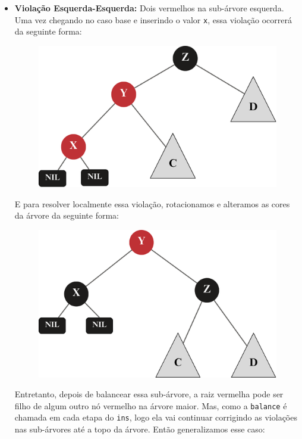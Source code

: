 \begin{itemize}
	\item \textbf{Violação Esquerda-Esquerda:} Dois vermelhos na sub-árvore esquerda. \\
	      Uma vez chegando no caso base e inserindo o valor \texttt{x}, essa violação ocorrerá da seguinte forma:
	      \begin{figure}[!ht]
		      \centering
		      \includegraphics[scale=0.5]{figures/rubro-negra/left-left-insertion.png}
		      \caption{}
	      \end{figure}
	      \FloatBarrier
	      E para resolver localmente essa violação, rotacionamos e alteramos as cores da árvore da seguinte forma:
	      \begin{figure}[!ht]
		      \centering
		      \includegraphics[scale=0.5]{figures/rubro-negra/left-left-base-solution.png}
		      \caption{}
	      \end{figure}
	      \FloatBarrier
	      Entretanto, depois de balancear essa sub-árvore, a raiz vermelha pode ser filho de algum outro nó vermelho na árvore maior. Mas, como a \texttt{balance} é chamada em cada etapa do \texttt{ins}, logo ela vai continuar corrigindo as violações nas sub-árvores até a topo da árvore. Então generalizamos esse caso:

\end{itemize}
